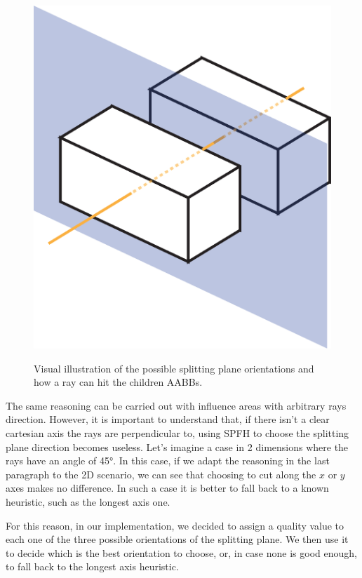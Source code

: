 \documentclass{PoliMi_MasterThesis}
\begin{document}
\begin{figure}[H]
{    	\includegraphics[scale=0.125]{Images/z_axis_plane.png}
	}
    \caption{Visual illustration of the possible splitting plane orientations and how a ray can hit the children AABBs.}
    \label{fig:ray_facing_simplest_case}
\end{figure}

The same reasoning can be carried out with influence areas with arbitrary rays direction. However, it is important to understand that, if there isn't a clear cartesian axis the rays are perpendicular to, using SPFH to choose the splitting plane direction becomes useless. Let's imagine a case in 2 dimensions where the rays have an angle of 45°. In this case, if we adapt the reasoning in the last paragraph to the 2D scenario, we can see that choosing to cut along the $x$ or $y$ axes makes no difference. In such a case it is better to fall back to a known heuristic, such as the longest axis one.

For this reason, in our implementation, we decided to assign a quality value to each one of the three possible orientations of the splitting plane. We then use it to decide which is the best orientation to choose, or, in case none is good enough, to fall back to the longest axis heuristic.
\end{document}
